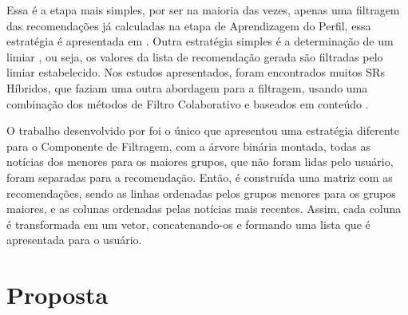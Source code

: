 \documentclass[
    12pt,                %
    oneside,            %
    a4paper,            %
    english,            %
    brazil                %
    ]{abntex2ppgsi}
\begin{document}
Essa é a etapa mais simples, por ser na maioria das vezes, apenas uma filtragem das recomendações já calculadas na etapa de Aprendizagem do Perfil, essa estratégia é apresentada em . Outra estratégia simples é a determinação de um limiar \cite{Capelle2012, Lops2013}, ou seja, os valores da lista de recomendação gerada são filtradas pelo limiar estabelecido. Nos estudos apresentados, foram encontrados muitos SRs Híbridos, que faziam uma outra abordagem para a filtragem, usando uma combinação dos métodos de Filtro Colaborativo e baseados em conteúdo \cite{Lops2013, Qu2012, Domingues2012, Spaeth2013, Vaz2012}.

O trabalho desenvolvido por  foi o único que apresentou uma estratégia diferente para o Componente de Filtragem, com a árvore binária montada, todas as notícias dos menores para os maiores grupos, que não foram lidas pelo usuário, foram separadas para a recomendação. Então, é construída uma matriz com as recomendações, sendo as linhas ordenadas pelos grupos menores para os grupos maiores, e as colunas ordenadas pelas notícias mais recentes. Assim, cada coluna é transformada em um vetor, concatenando-os e formando uma lista que é apresentada para o usuário.

\chapter{Proposta}



%

%

\end{document}

